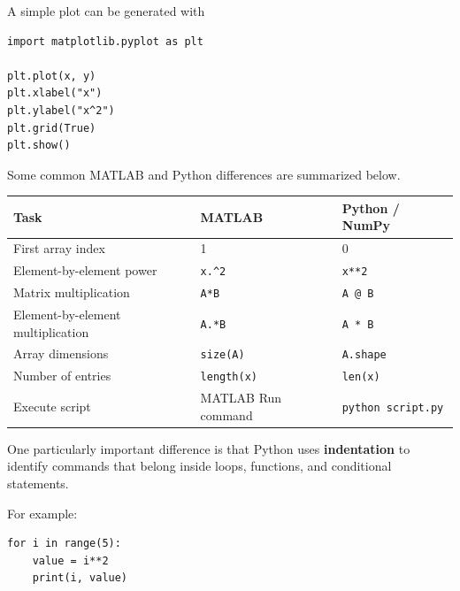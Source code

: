 \documentclass[11pt]{article}
\begin{document}
A simple plot can be generated with

\begin{lstlisting}[style=python]
import matplotlib.pyplot as plt

plt.plot(x, y)
plt.xlabel("x")
plt.ylabel("x^2")
plt.grid(True)
plt.show()
\end{lstlisting}

Some common MATLAB and Python differences are summarized below.

\begin{center}

{\small
\renewcommand{\arraystretch}{1.18}

\begin{tabularx}{0.96\linewidth}
{@{}P{1.75in}P{1.65in}Y@{}}

\toprule

\textbf{Task} &
\textbf{MATLAB} &
\textbf{Python / NumPy}
\\

\midrule

First array index &
1 &
0
\\

Element-by-element power &
\texttt{x.\^{}2} &
\texttt{x**2}
\\

Matrix multiplication &
\texttt{A*B} &
\texttt{A @ B}
\\

Element-by-element multiplication &
\texttt{A.*B} &
\texttt{A * B}
\\

Array dimensions &
\texttt{size(A)} &
\texttt{A.shape}
\\

Number of entries &
\texttt{length(x)} &
\texttt{len(x)}
\\

Execute script &
MATLAB Run command &
\texttt{python script.py}
\\

\bottomrule

\end{tabularx}
}

\end{center}

One particularly important difference is that Python uses
\textbf{indentation} to identify commands that belong inside loops,
functions, and conditional statements.

For example:

\begin{lstlisting}[style=python]
for i in range(5):
    value = i**2
    print(i, value)
\end{lstlisting}
\end{document}
